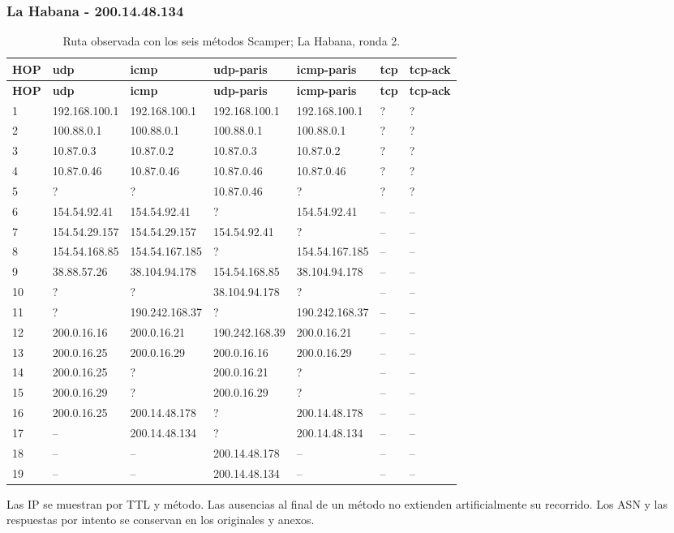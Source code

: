 \begin{landscape}
\subsubsection{La Habana - 200.14.48.134}
\begingroup
\fontsize{9}{11}\selectfont
\begin{longtable}{p{0.95cm}p{3.725cm}p{3.725cm}p{3.725cm}p{3.725cm}p{3.725cm}p{3.725cm}}
\caption{Ruta observada con los seis métodos Scamper; La Habana, ronda 2.}\label{tabla1:200.14.48.134} \\
\toprule
\textbf{HOP} & \textbf{udp} & \textbf{icmp} & \textbf{udp-paris} & \textbf{icmp-paris} & \textbf{tcp} & \textbf{tcp-ack} \\ \midrule
\endfirsthead
\toprule
\textbf{HOP} & \textbf{udp} & \textbf{icmp} & \textbf{udp-paris} & \textbf{icmp-paris} & \textbf{tcp} & \textbf{tcp-ack} \\ \midrule
\endhead
1 & 192.168.100.1 & 192.168.100.1 & 192.168.100.1 & 192.168.100.1 & ? & ? \\
2 & 100.88.0.1 & 100.88.0.1 & 100.88.0.1 & 100.88.0.1 & ? & ? \\
3 & 10.87.0.3 & 10.87.0.2 & 10.87.0.3 & 10.87.0.2 & ? & ? \\
4 & 10.87.0.46 & 10.87.0.46 & 10.87.0.46 & 10.87.0.46 & ? & ? \\
5 & ? & ? & 10.87.0.46 & ? & ? & ? \\
6 & 154.54.92.41 & 154.54.92.41 & ? & 154.54.92.41 & -- & -- \\
7 & 154.54.29.157 & 154.54.29.157 & 154.54.92.41 & ? & -- & -- \\
8 & 154.54.168.85 & 154.54.167.185 & ? & 154.54.167.185 & -- & -- \\
9 & 38.88.57.26 & 38.104.94.178 & 154.54.168.85 & 38.104.94.178 & -- & -- \\
10 & ? & ? & 38.104.94.178 & ? & -- & -- \\
11 & ? & 190.242.168.37 & ? & 190.242.168.37 & -- & -- \\
12 & 200.0.16.16 & 200.0.16.21 & 190.242.168.39 & 200.0.16.21 & -- & -- \\
13 & 200.0.16.25 & 200.0.16.29 & 200.0.16.16 & 200.0.16.29 & -- & -- \\
14 & 200.0.16.25 & ? & 200.0.16.21 & ? & -- & -- \\
15 & 200.0.16.29 & ? & 200.0.16.29 & ? & -- & -- \\
16 & 200.0.16.25 & 200.14.48.178 & ? & 200.14.48.178 & -- & -- \\
17 & -- & 200.14.48.134 & ? & 200.14.48.134 & -- & -- \\
18 & -- & -- & 200.14.48.178 & -- & -- & -- \\
19 & -- & -- & 200.14.48.134 & -- & -- & -- \\
\bottomrule
\end{longtable}
\endgroup
Las IP se muestran por TTL y método. Las ausencias al final de un método no extienden artificialmente su recorrido. Los ASN y las respuestas por intento se conservan en los originales y anexos.

\end{landscape}

